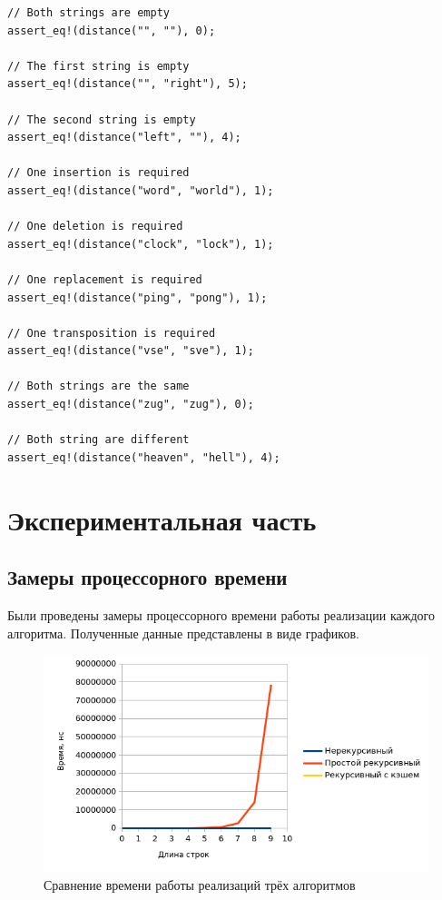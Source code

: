 \documentclass{report}
\begin{document}
\begin{lstlisting}[caption=Тесты реализаций алгоритмов поиска расстояния Дамерау-Левенштейна]
// Both strings are empty
assert_eq!(distance("", ""), 0);

// The first string is empty
assert_eq!(distance("", "right"), 5);

// The second string is empty
assert_eq!(distance("left", ""), 4);

// One insertion is required
assert_eq!(distance("word", "world"), 1);

// One deletion is required
assert_eq!(distance("clock", "lock"), 1);

// One replacement is required
assert_eq!(distance("ping", "pong"), 1);

// One transposition is required
assert_eq!(distance("vse", "sve"), 1);

// Both strings are the same
assert_eq!(distance("zug", "zug"), 0);

// Both string are different
assert_eq!(distance("heaven", "hell"), 4);
\end{lstlisting}

\chapter{Экспериментальная часть}

\section{Замеры процессорного времени}

Были проведены замеры процессорного времени работы реализации
каждого алгоритма. Полученные данные представлены в виде графиков.

\begin{figure}[ht]
    \centering
    \includegraphics[width=\textwidth]{plt-01.png}
    \caption{Сравнение времени работы реализаций трёх алгоритмов}
\end{figure}
\end{document}
